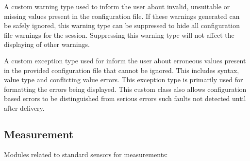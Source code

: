 \documentclass[letterpaper,10pt,english]{sphinxmanual}
\begin{document}

\begin{fulllineitems}
\label{\detokenize{modules/input/config_handler:qnav.input.config_handler.NavConfigWarning}}
\pysigstartsignatures
{}
\pysigstopsignatures
\sphinxAtStartPar
A custom warning type used to inform the user about invalid, unsuitable
or missing values present in the configuration file. If these warnings
generated can be safely ignored, this warning type can be suppressed
to hide all configuration file warnings for the session. Suppressing
this warning type will not affect the displaying of other warnings.

\end{fulllineitems}


\begin{fulllineitems}
\label{\detokenize{modules/input/config_handler:qnav.input.config_handler.NavConfigError}}
\pysigstartsignatures
{}
\pysigstopsignatures
\sphinxAtStartPar
A custom exception type used for inform the user about erroneous values
present in the provided configuration file that cannot be ignored. This
includes syntax, value type and conflicting value errors. This exception
type is primarily used for formatting the errors being displayed. This
custom class also allows configuration based errors to be distinguished
from serious errors such faults not detected until after delivery.

\end{fulllineitems}



\subsection{Measurement}
\label{\detokenize{usage/packages:measurement}}
\sphinxAtStartPar
Modules related to standard sensors for measurements:
\end{document}
